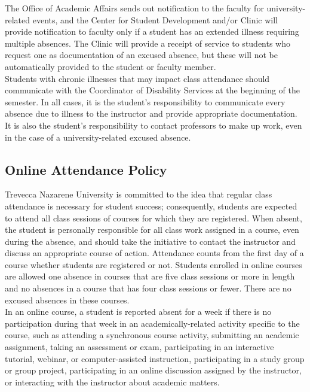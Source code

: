\documentclass[11pt]{article}
\begin{document}
The Office of Academic Affairs sends out notification to the faculty for university-related events, and the Center for Student Development and/or Clinic will provide notification to faculty only if a student has an extended illness requiring multiple absences. The Clinic will provide a receipt of service to students who request one as documentation of an excused absence, but these will not be automatically provided to the student or faculty member.\\

Students with chronic illnesses that may impact class attendance should communicate with the Coordinator of Disability Services at the beginning of the semester. In all cases, it is the student’s responsibility to communicate every absence due to illness to the instructor and provide appropriate documentation. It is also the student’s responsibility to contact professors to make up work, even in the case of a university-related excused absence.


\subsection*{Online Attendance Policy}
Trevecca Nazarene University is committed to the idea that regular class attendance is necessary for student success; consequently, students are expected to attend all class sessions of courses for which they are registered. When absent, the student is personally responsible for all class work assigned in a course, even during the absence, and should take the initiative to contact the instructor and discuss an appropriate course of action. Attendance counts from the first day of a course whether students are registered or not. Students enrolled in online courses are allowed one absence in courses that are five class sessions or more in length and no absences in a course that has four class sessions or fewer. There are no excused absences in these courses.\\

In an online course, a student is reported absent for a week if there is no participation during that week in an academically-related activity specific to the course, such as attending a synchronous course activity, submitting an academic assignment, taking an assessment or exam, participating in an interactive tutorial, webinar, or computer-assisted instruction, participating in a study group or group project, participating in an online discussion assigned by the instructor, or interacting with the instructor about academic matters.
\end{document}
